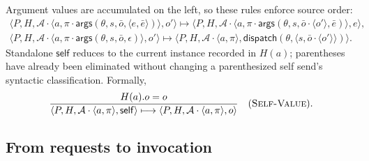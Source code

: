 \documentclass[11pt]{article}
\numberwithin{equation}{section}
\newcommand{\kw}[1]{\ensuremath{\mathsf{#1}}}
\newcommand{\rulelabel}[1]{\textsc{#1}}
\begin{document}
Argument values are accumulated on the left, so these rules enforce source
order:
\begin{equation}\label{eq:argument-continuations}
\begin{array}{c}
\langle P,H,\mathcal A\cdot
 \langle a,\pi\cdot\kw{args}(\theta,s,\bar o,
                              \langle e,\bar e\rangle)\rangle,o'\rangle
\longmapsto
\langle P,H,\mathcal A\cdot
 \langle a,\pi\cdot\kw{args}(\theta,s,
                 \bar o\cdot\langle o'\rangle,\bar e)\rangle,e\rangle,
\\[2ex]
\langle P,H,\mathcal A\cdot
 \langle a,\pi\cdot\kw{args}(\theta,s,\bar o,\epsilon)\rangle,o'\rangle
\longmapsto
\langle P,H,\mathcal A\cdot\langle a,\pi\rangle,
 \kw{dispatch}(\theta,\langle s,\bar o\cdot\langle o'\rangle\rangle)\rangle.
\end{array}
\end{equation}
Standalone $\kw{self}$ reduces to the current instance recorded in $H(a)$;
parentheses have already been eliminated without changing a parenthesized self
send's syntactic classification.
Formally,
\[
 \dfrac{H(a).o=o}
 {\langle P,H,\mathcal A\cdot\langle a,\pi\rangle,\kw{self}\rangle
  \longmapsto
  \langle P,H,\mathcal A\cdot\langle a,\pi\rangle,o\rangle}
 \quad(\rulelabel{Self-Value}).
\]

\subsection{From requests to invocation}
\end{document}
